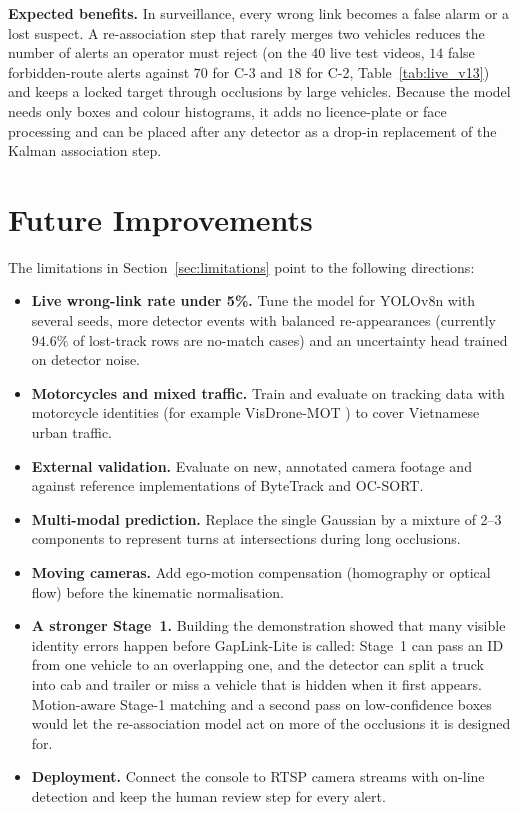 \textbf{Expected benefits.} In surveillance, every wrong link becomes a false alarm or a lost suspect. A re-association step that rarely merges two vehicles reduces the number of alerts an operator must reject (on the $40$ live test videos, $14$ false forbidden-route alerts against $70$ for C-3 and $18$ for C-2, Table~\ref{tab:live_v13}) and keeps a locked target through occlusions by large vehicles. Because the model needs only boxes and colour histograms, it adds no licence-plate or face processing and can be placed after any detector as a drop-in replacement of the Kalman association step.

\section{Future Improvements}
\label{sec:future_improvements}

The limitations in Section~\ref{sec:limitations} point to the following directions:
\begin{itemize}
    \item \textbf{Live wrong-link rate under 5\%.} Tune the model for YOLOv8n with several seeds, more detector events with balanced re-appearances (currently $94.6\%$ of lost-track rows are no-match cases) and an uncertainty head trained on detector noise.
    \item \textbf{Motorcycles and mixed traffic.} Train and evaluate on tracking data with motorcycle identities (for example VisDrone-MOT \cite{zhu2021visdrone}) to cover Vietnamese urban traffic.
    \item \textbf{External validation.} Evaluate on new, annotated camera footage and against reference implementations of ByteTrack and OC-SORT.
    \item \textbf{Multi-modal prediction.} Replace the single Gaussian by a mixture of 2--3 components to represent turns at intersections during long occlusions.
    \item \textbf{Moving cameras.} Add ego-motion compensation (homography or optical flow) before the kinematic normalisation.
    \item \textbf{A stronger Stage~1.} Building the demonstration showed that many visible identity errors happen before GapLink-Lite is called: Stage~1 can pass an ID from one vehicle to an overlapping one, and the detector can split a truck into cab and trailer or miss a vehicle that is hidden when it first appears. Motion-aware Stage-1 matching and a second pass on low-confidence boxes would let the re-association model act on more of the occlusions it is designed for.
    \item \textbf{Deployment.} Connect the console to RTSP camera streams with on-line detection and keep the human review step for every alert.
\end{itemize}
